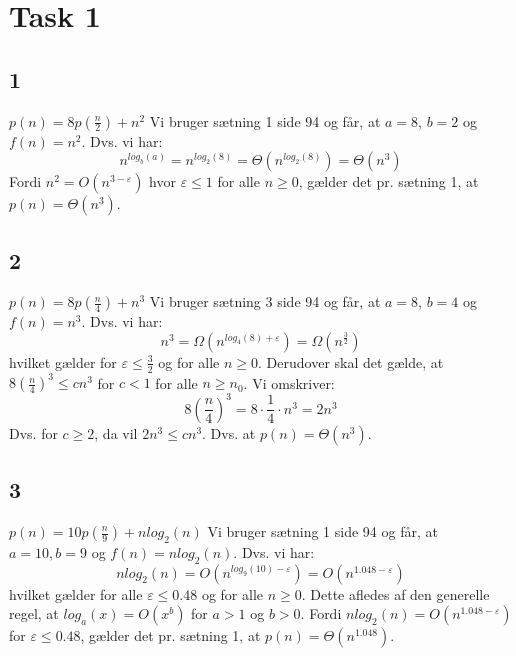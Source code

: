 \section{Task 1}

\subsection{1}

$p(n) = 8p(\frac{n}{2}) + n^2$
Vi bruger sætning 1 side 94 og får, at $a = 8$, $b = 2$ og $f(n) = n^2$.
Dvs. vi har:
$$n^{log_b(a)} = n^{log_2(8)} = \Theta(n^{log_2(8)}) = \Theta(n^3)$$
Fordi $n^2 = O(n^{3-\varepsilon})$ hvor $\varepsilon \leq 1$ for alle $n \geq 0$, gælder det pr. sætning 1, at $p(n) = \Theta(n^3)$.

\subsection{2}

$p(n) = 8p(\frac{n}{4}) + n^3$
Vi bruger sætning 3 side 94 og får, at $a = 8$, $b = 4$ og $f(n) = n^3$.
Dvs. vi har:
$$n^3 = \Omega(n^{log_4(8)+\varepsilon}) = \Omega(n^{\frac{3}{2}})$$
hvilket gælder for $\varepsilon \leq \frac{3}{2}$ og for alle $n \geq 0$.
Derudover skal det gælde, at $8(\frac{n}{4})^3 \leq cn^3$ for $c < 1$ for alle $n \geq n_0$. Vi omskriver:
$$8(\frac{n}{4})^3 = 8 \cdot \frac{1}{4} \cdot n^3 = 2n^3$$
Dvs. for $c \geq 2$, da vil $2n^3 \leq cn^3$.
Dvs. at $p(n) = \Theta(n^3)$.

\subsection{3}

$p(n) = 10p(\frac{n}{9}) + nlog_2(n)$
Vi bruger sætning 1 side 94 og får, at $a = 10, b = 9$ og $f(n) = nlog_2(n)$.
Dvs. vi har:
$$nlog_2(n) = O(n^{log_9(10)-\varepsilon}) = O(n^{1.048 - \varepsilon})$$
hvilket gælder for alle $\varepsilon \leq 0.48$ og for alle $n \geq 0$.
Dette afledes af den generelle regel, at $log_a(x) = O(x^b)$ for $a > 1$ og $b > 0$.
Fordi $nlog_2(n) = O(n^{1.048 - \varepsilon})$ for $\varepsilon \leq 0.48$, gælder det pr. sætning 1, at $p(n) = \Theta(n^{1.048})$.

